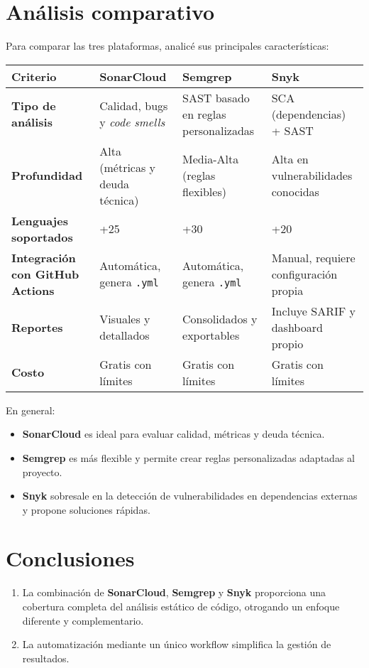 \documentclass[12pt, a4paper]{article}
\begin{document}
\section{Análisis comparativo}
Para comparar las tres plataformas, analicé sus principales características:

\begin{table}[h!]
\footnotesize
\centering
\begin{tabularx}{\textwidth}{@{} L{3.6cm} L{2.7cm} L{2.3cm} Y @{}}
\toprule
\textbf{Criterio} & \textbf{SonarCloud} & \textbf{Semgrep} & \textbf{Snyk} \\
\midrule
\textbf{Tipo de análisis} & Calidad, bugs y \textit{code smells} & SAST basado en reglas personalizadas & SCA (dependencias) + SAST \\
\textbf{Profundidad} & Alta (métricas y deuda técnica) & Media-Alta (reglas flexibles) & Alta en vulnerabilidades conocidas \\
\textbf{Lenguajes soportados} & +25 & +30 & +20 \\
\textbf{Integración con GitHub Actions} & Automática, genera \texttt{.yml} & Automática, genera \texttt{.yml} & Manual, requiere configuración propia \\
\textbf{Reportes} & Visuales y detallados & Consolidados y exportables & Incluye SARIF y dashboard propio \\
\textbf{Costo} & Gratis con límites & Gratis con límites & Gratis con límites\\
\bottomrule
\end{tabularx}
\end{table}

En general:
\begin{itemize}
    \item \textbf{SonarCloud} es ideal para evaluar calidad, métricas y deuda técnica.
    \item \textbf{Semgrep} es más flexible y permite crear reglas personalizadas adaptadas al proyecto.
    \item \textbf{Snyk} sobresale en la detección de vulnerabilidades en dependencias externas y propone soluciones rápidas.
\end{itemize}

\section{Conclusiones}
\begin{enumerate}
    \item La combinación de \textbf{SonarCloud}, \textbf{Semgrep} y \textbf{Snyk} proporciona una cobertura completa del análisis estático de código, 
    otrogando un enfoque diferente y complementario.
    \item La automatización mediante un único workflow simplifica la gestión de resultados.
\end{enumerate}
\end{document}
